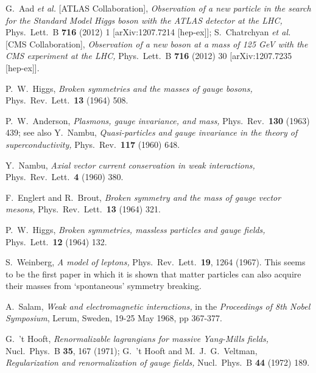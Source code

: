 \documentclass[12pt]{article}
\numberwithin{equation}{section}
\begin{document}
\begin{thebibliography}{99}

 G.~Aad {\it et al.}  [ATLAS Collaboration],
 {\it Observation of a new particle in the search for the Standard Model Higgs boson with the ATLAS detector at the LHC,}
  Phys.\ Lett.\ B {\bf 716} (2012) 1
  [arXiv:1207.7214 [hep-ex]];
S.~Chatrchyan {\it et al.}  [CMS Collaboration],
{\it Observation of a new boson at a mass of 125 GeV with the CMS experiment at the LHC,}
  Phys.\ Lett.\ B {\bf 716} (2012) 30
  [arXiv:1207.7235 [hep-ex]].

P.~W.~Higgs,
{\it Broken symmetries and the masses of gauge bosons,}
  Phys.\ Rev.\ Lett.\  {\bf 13} (1964) 508.
  
P.~W.~Anderson,
{\it Plasmons, gauge invariance, and mass,}
  Phys.\ Rev.\  {\bf 130} (1963) 439;
  see also
  Y.~Nambu,
{\it Quasi-particles and gauge invariance in the theory of  superconductivity,}
  Phys.\ Rev.\  {\bf 117} (1960) 648.

Y.~Nambu,
{\it Axial vector current conservation in weak interactions,}
  Phys.\ Rev.\ Lett.\  {\bf 4} (1960) 380.
  
F.~Englert and R.~Brout,
{\it Broken symmetry and the mass of gauge vector mesons,}
  Phys.\ Rev.\ Lett.\  {\bf 13} (1964) 321.
  
P.~W.~Higgs,
{\it Broken symmetries, massless particles and gauge fields,}
  Phys.\ Lett.\  {\bf 12} (1964) 132.
    
S.~Weinberg,
{\it A model of leptons,}
  Phys.\ Rev.\ Lett.\  {\bf 19}, 1264 (1967).
This seems to be the first paper in which it is shown that matter particles can also acquire their
masses from `spontaneous' symmetry breaking.

A.~Salam,
{\it Weak and electromagnetic interactions,}
in the {\it Proceedings of 8th Nobel Symposium}, Lerum, Sweden, 19-25 May 1968, pp 367-377.
  
G.~'t Hooft,
{\it Renormalizable lagrangians for massive Yang-Mills fields,}
  Nucl.\ Phys.\  B {\bf 35}, 167 (1971);
  G.~'t Hooft and M.~J.~G.~Veltman,
{\it Regularization and renormalization of gauge fields,}
  Nucl.\ Phys.\  B {\bf 44} (1972) 189.
  

\end{thebibliography}
\end{document}
